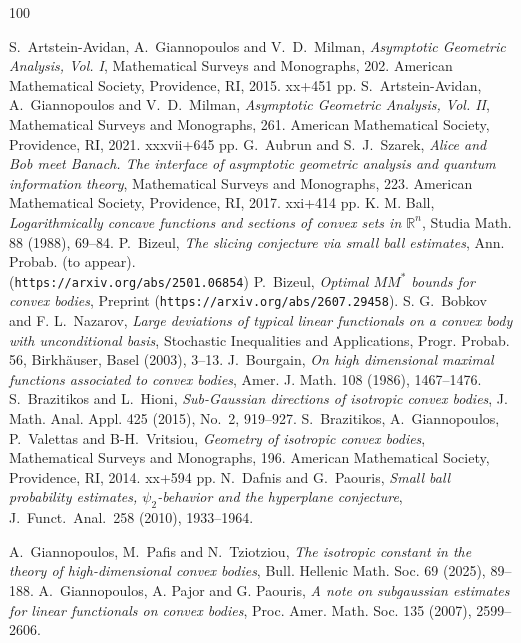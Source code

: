\documentclass[11pt,leqno]{article}
\theoremstyle{definition}
\numberwithin{equation}{section}
\begin{document}
\footnotesize

\begin{thebibliography}{100}
\footnotesize

 \textrm{S.\ Artstein-Avidan, A.\ Giannopoulos and V.\ D.\ Milman},
\textit{Asymptotic Geometric Analysis, Vol. I}, Mathematical Surveys and Monographs, 202.
American Mathematical Society, Providence, RI, 2015. xx+451 pp.
 \textrm{S.\ Artstein-Avidan, A.\ Giannopoulos and V.\ D.\ Milman},
\textit{Asymptotic Geometric Analysis, Vol. II}, Mathematical Surveys and Monographs, 261.
American  Mathematical Society, Providence, RI, 2021. xxxvii+645 pp.
 \textrm{G.~Aubrun and S.~J.~Szarek}, \textit{Alice and Bob meet Banach. The interface of asymptotic geometric analysis and quantum information theory}, 
Mathematical Surveys and Monographs, 223. American Mathematical Society, Providence, RI, 2017. xxi+414 pp.
 \textrm{K. M. Ball}, \textit{Logarithmically concave functions and sections of convex sets in ${\mathbb{R}}^n$},
Studia Math. {88} (1988), 69--84.
 \textrm{P.\ Bizeul}, \textit{The slicing conjecture via small ball estimates}, Ann. Probab. (to appear).\\
({\tt https://arxiv.org/abs/2501.06854})
 \textrm{P.\ Bizeul}, \textit{Optimal $MM^{\ast}$ bounds for convex bodies}, Preprint 
({\tt https://arxiv.org/abs/2607.29458}).
 \textrm{S. G.\ Bobkov and F. L.\ Nazarov}, \textit{Large deviations of
typical linear functionals on a convex body with unconditional basis}, Stochastic Inequalities and Applications, Progr. Probab.
{56}, Birkh\"{a}user, Basel (2003), 3--13.
 \textrm{J.\ Bourgain}, \textit{On high dimensional
maximal functions associated to convex bodies}, Amer. J. Math. {108} (1986), 1467--1476.
 \textrm{S.~Brazitikos and L.~Hioni}, \textit{Sub-Gaussian directions of isotropic convex bodies}, 
J. Math. Anal. Appl. 425 (2015), No.~2, 919--927.
 \textrm{S.\ Brazitikos, A.\ Giannopoulos, P.\ Valettas and B-H.\ Vritsiou},
\textit{Geometry of isotropic convex bodies}, Mathematical Surveys and Monographs, 196.
American Mathematical Society, Providence, RI, 2014. xx+594 pp.
 \textrm{N.\ Dafnis and G.\ Paouris}, \textit{Small ball probability estimates,
$\psi_2$-behavior and the hyperplane conjecture}, J.\ Funct.\ Anal.\ {258} (2010), 1933--1964.

 \textrm{A.\ Giannopoulos, M.\ Pafis and N.\ Tziotziou}, 
\textit{The isotropic constant in the theory of high-dimensional convex bodies}, Bull. Hellenic Math. Soc. 69 (2025), 89--188.
 \textrm{A.\ Giannopoulos, A. Pajor and G. Paouris}, \textit{A note on subgaussian estimates for linear
functionals on convex bodies}, Proc. Amer. Math. Soc. {135}
(2007), 2599--2606.


\end{thebibliography}
\end{document}
